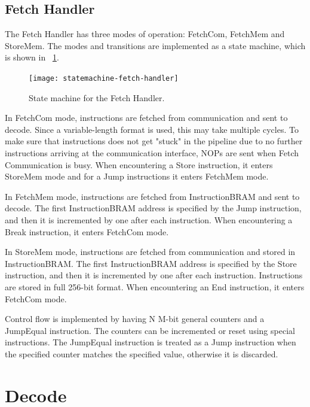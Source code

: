 \subsection{Fetch Handler}

The Fetch Handler has three modes of operation: FetchCom, FetchMem and StoreMem.
The modes and transitions are implemented as a state machine, which is shown in \figurename~\ref{fig:statemachine-fetch-handler}.

\begin{figure}[!ht]
    \centering
    \texttt{[image: statemachine-fetch-handler]}
    \caption[Fetch Handler state machine]{State machine for the Fetch Handler.}
    \label{fig:statemachine-fetch-handler}
\end{figure}

In FetchCom mode, instructions are fetched from communication and sent to decode.
Since a variable-length format is used, this may take multiple cycles.
To make sure that instructions does not get "stuck" in the pipeline due to no further instructions arriving at the communication interface, NOPs are sent when Fetch Communication is busy.
When encountering a Store instruction, it enters StoreMem mode and for a Jump instructions it enters FetchMem mode.

In FetchMem mode, instructions are fetched from InstructionBRAM and sent to decode.
The first InstructionBRAM address is specified by the Jump instruction, and then it is incremented by one after each instruction.
When encountering a Break instruction, it enters FetchCom mode.

In StoreMem mode, instructions are fetched from communication and stored in InstructionBRAM.
The first InstructionBRAM address is specified by the Store instruction, and then it is incremented by one after each instruction.
Instructions are stored in full 256-bit format.
When encountering an End instruction, it enters FetchCom mode.

Control flow is implemented by having N M-bit general counters and a JumpEqual instruction.
The counters can be incremented or reset using special instructions.
The JumpEqual instruction is treated as a Jump instruction when the specified counter matches the specified value, otherwise it is discarded.


\section{Decode}

